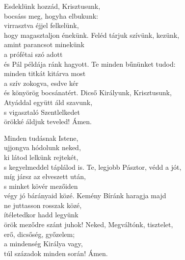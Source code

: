 \documentclass[twoside]{article}
\begin{document}
\begin{hymnstanzas}
    Esdeklünk hozzád, Krisztusunk,\\
    bocsáss meg, hogyha elbukunk:\\
    virrasztva éjjel felkelünk,\\
    hogy magasztaljon énekünk.
\stanzabreak
    Feléd tárjuk szívünk, kezünk,\\
    amint parancsot minekünk\\
    a prófétai szó adott\\
    és Pál példája ránk hagyott.
\stanzabreak
    Te minden bűnünket tudod:\\
    minden titkát kitárva most\\
    a szív zokogva, esdve kér\\
    és könyörög bocsánatért.
\stanzabreak
    Dicső Királyunk, Krisztusunk,\\
    Atyáddal együtt áld szavunk,\\
    s vigasztaló Szentlelkedet\\
    örökké áldjuk teveled! Ámen.
\end{hymnstanzas}
\begin{hymnstanzas}
    Minden tudásnak Istene,\\
    ujjongva hódolunk neked,\\
    ki látod lelkünk rejtekét,\\
    s kegyelmeddel táplálod is.
\stanzabreak
    Te, legjobb Pásztor, védd a jót,\\
    míg jársz az elveszett után,\\
    s minket kövér mezőiden\\
    végy jó bárányaid közé.
\stanzabreak
    Kemény Bíránk haragja majd\\
    ne juttasson rosszak közé,\\
    ítéletedkor hadd legyünk\\
    örök meződre szánt juhok!
\stanzabreak
    Neked, Megváltónk, tisztelet,\\
    erő, dicsőség, győzelem;\\
    a mindenség Királya vagy,\\
    túl századok minden során! Ámen.
\end{hymnstanzas}
\end{document}
